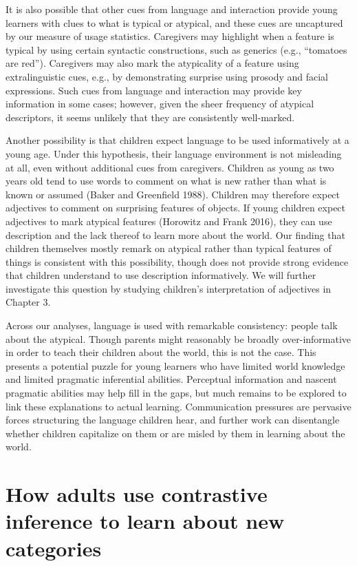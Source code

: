\documentclass{ucetd}
\begin{document}
It is also possible that other cues from language and interaction
provide young learners with clues to what is typical or atypical, and
these cues are uncaptured by our measure of usage statistics. Caregivers
may highlight when a feature is typical by using certain syntactic
constructions, such as generics (e.g., ``tomatoes are red''). Caregivers
may also mark the atypicality of a feature using extralinguistic cues,
e.g., by demonstrating surprise using prosody and facial expressions.
Such cues from language and interaction may provide key information in
some cases; however, given the sheer frequency of atypical descriptors,
it seems unlikely that they are consistently well-marked.

Another possibility is that children expect language to be used
informatively at a young age. Under this hypothesis, their language
environment is not misleading at all, even without additional cues from
caregivers. Children as young as two years old tend to use words to
comment on what is new rather than what is known or assumed (Baker and
Greenfield 1988). Children may therefore expect adjectives to comment on
surprising features of objects. If young children expect adjectives to
mark atypical features (Horowitz and Frank 2016), they can use
description and the lack thereof to learn more about the world. Our
finding that children themselves mostly remark on atypical rather than
typical features of things is consistent with this possibility, though
does not provide strong evidence that children understand to use
description informatively. We will further investigate this question by
studying children's interpretation of adjectives in Chapter 3.

Across our analyses, language is used with remarkable consistency:
people talk about the atypical. Though parents might reasonably be
broadly over-informative in order to teach their children about the
world, this is not the case. This presents a potential puzzle for young
learners who have limited world knowledge and limited pragmatic
inferential abilities. Perceptual information and nascent pragmatic
abilities may help fill in the gaps, but much remains to be explored to
link these explanations to actual learning. Communication pressures are
pervasive forces structuring the language children hear, and further
work can disentangle whether children capitalize on them or are misled
by them in learning about the world.

\hypertarget{how-adults-use-contrastive-inference-to-learn-about-new-categories}{%
\chapter{How adults use contrastive inference to learn about new
categories}\label{how-adults-use-contrastive-inference-to-learn-about-new-categories}}
\end{document}
